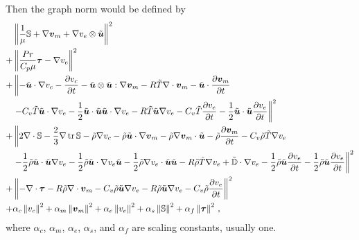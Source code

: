 \documentclass[Proposal.tex]{subfiles}
\begin{document}
Then the graph norm would be defined by
\begin{equation}
\begin{aligned}
&\left\| \frac{1}{\mu}\mathbb{S}+\nabla\boldsymbol v_m+\nabla v_e\otimes\tilde{\boldsymbol u} \right\|^2\\
+&\left\| \frac{Pr}{C_p\mu}\boldsymbol\tau-\nabla v_e \right\|^2\\
+&\left\|
-\tilde{\boldsymbol u}\cdot\nabla v_c-\frac{\partial v_c}{\partial t}-\tilde{\boldsymbol u}\otimes\tilde{\boldsymbol u}:\nabla\boldsymbol v_m
-R\tilde T\nabla\cdot\boldsymbol v_m-\tilde{\boldsymbol u}\cdot\frac{\partial\boldsymbol v_m}{\partial t}\right.\\
&\left.-C_v\tilde T\tilde{\boldsymbol u}\cdot\nabla v_e-\frac{1}{2}\tilde{\boldsymbol u}\cdot\tilde{\boldsymbol u}\tilde{\boldsymbol u}\cdot\nabla v_e
-R\tilde T\tilde{\boldsymbol u}\nabla v_e
-C_v\tilde T\frac{\partial v_e}{\partial t}-\frac{1}{2}\tilde{\boldsymbol u}\cdot\tilde{\boldsymbol u}\frac{\partial v_e}{\partial t}
\right\|^2\\
+&\left\|2\nabla\cdot\mathbb{S}-\frac{2}{3}\nabla\operatorname*{tr}{\mathbb{S}}
-\tilde\rho\nabla v_c
-\tilde\rho\tilde{\boldsymbol u}\cdot\nabla\boldsymbol v_m-\tilde\rho\nabla\boldsymbol v_m\cdot\tilde{\boldsymbol u}
-\tilde\rho\frac{\partial\boldsymbol v_m}{\partial t}
-C_v\tilde\rho\tilde T\nabla v_e\right.\\
&\left.
-\frac{1}{2}\tilde\rho\tilde{\boldsymbol u}\cdot\tilde{\boldsymbol u}\nabla v_e
-\frac{1}{2}\tilde\rho\tilde{\boldsymbol u}\cdot\nabla v_e\tilde{\boldsymbol u}
-\frac{1}{2}\tilde\rho\nabla v_e\cdot\tilde{\boldsymbol u}\tilde{\boldsymbol u}
-R\tilde\rho\tilde T\nabla v_e
+\tilde{\mathbb{D}}\cdot\nabla v_e
-\frac{1}{2}\tilde\rho\tilde{\boldsymbol u}\frac{\partial v_e}{\partial t}
-\frac{1}{2}\tilde\rho\tilde{\boldsymbol u}\frac{\partial v_e}{\partial t}
\right\|^2\\
+&\left\|-\nabla\cdot\boldsymbol\tau
-R\tilde\rho\nabla\cdot\boldsymbol v_m
-C_v\tilde\rho\tilde{\boldsymbol u}\nabla v_e
-R\tilde\rho\tilde{\boldsymbol u}\nabla v_e
-C_v\tilde\rho\frac{\partial v_e}{\partial t}
\right\|^2\\
+&\alpha_c\left\| v_c \right\|^2
+\alpha_m\left\| \boldsymbol v_m \right\|^2
+\alpha_e\left\| v_e \right\|^2
+\alpha_s\left\| \mathbb{S} \right\|^2
+\alpha_f\left\| \boldsymbol\tau \right\|^2
\,,
\end{aligned}
\end{equation}
where $\alpha_c$, $\alpha_m$, $\alpha_e$, $\alpha_s$, and $\alpha_f$ are scaling constants, usually one.
\end{document}
